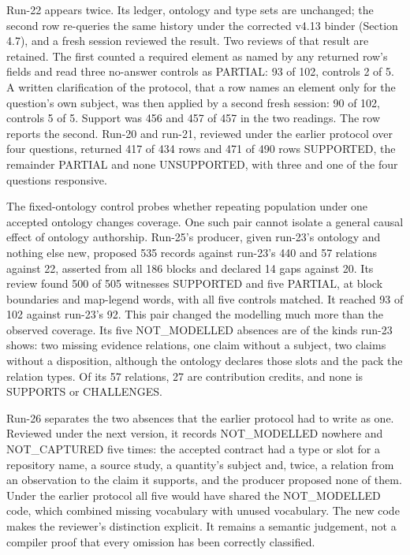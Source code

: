Run-22 appears twice. Its ledger, ontology and type sets are unchanged; the second row re-queries the same history under the corrected v4.13 binder (Section 4.7), and a fresh session reviewed the result. Two reviews of that result are retained. The first counted a required element as named by any returned row's fields and read three no-answer controls as PARTIAL: 93 of 102, controls 2 of 5. A written clarification of the protocol, that a row names an element only for the question's own subject, was then applied by a second fresh session: 90 of 102, controls 5 of 5. Support was 456 and 457 of 457 in the two readings. The row reports the second. Run-20 and run-21, reviewed under the earlier protocol over four questions, returned 417 of 434 rows and 471 of 490 rows SUPPORTED, the remainder PARTIAL and none UNSUPPORTED, with three and one of the four questions responsive.

The fixed-ontology control probes whether repeating population under one accepted ontology changes coverage. One such pair cannot isolate a general causal effect of ontology authorship. Run-25's producer, given run-23's ontology and nothing else new, proposed 535 records against run-23's 440 and 57 relations against 22, asserted from all 186 blocks and declared 14 gaps against 20. Its review found 500 of 505 witnesses SUPPORTED and five PARTIAL, at block boundaries and map-legend words, with all five controls matched. It reached 93 of 102 against run-23's 92. This pair changed the modelling much more than the observed coverage. Its five NOT\_\allowbreak{}MODELLED absences are of the kinds run-23 shows: two missing evidence relations, one claim without a subject, two claims without a disposition, although the ontology declares those slots and the pack the relation types. Of its 57 relations, 27 are contribution credits, and none is SUPPORTS or CHALLENGES.

Run-26 separates the two absences that the earlier protocol had to write as one. Reviewed under the next version, it records NOT\_\allowbreak{}MODELLED nowhere and NOT\_\allowbreak{}CAPTURED five times: the accepted contract had a type or slot for a repository name, a source study, a quantity's subject and, twice, a relation from an observation to the claim it supports, and the producer proposed none of them. Under the earlier protocol all five would have shared the NOT\_\allowbreak{}MODELLED code, which combined missing vocabulary with unused vocabulary. The new code makes the reviewer's distinction explicit. It remains a semantic judgement, not a compiler proof that every omission has been correctly classified.

